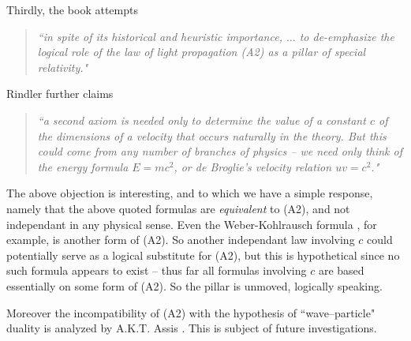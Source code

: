 \documentclass[12pt]{amsart}
\theoremstyle{definition}
\theoremstyle{remark}
\begin{document}
Thirdly, the book \cite[pp.8-10, 21-22]{rindler} attempts 
\begin{quote}
\emph{``in spite of its historical and heuristic importance, $\ldots$ to de-emphasize the logical role of the law of light propagation (A2) as a pillar of special relativity."}
\end{quote}
Rindler further claims 
\begin{quote}
\emph{``a second axiom is needed \emph{only} to determine the value of a constant $c$ of the dimensions of a velocity that occurs naturally in the theory. But this could come from any number of branches of physics -- we need only think of the energy formula $E=mc^2$, or de Broglie's velocity relation $u v =c^2$." }
\end{quote}
The above objection is interesting, and to which we have a simple response, namely that the above quoted formulas are \emph{equivalent} to (A2), and not independant in any physical sense. Even the Weber-Kohlrausch formula \cite{awk}, for example, is another form of (A2). So another independant law involving $c$ could potentially serve as a logical substitute for (A2), but this is hypothetical since no such formula appears to exist -- thus far all formulas involving $c$ are based essentially on some form of (A2). So the pillar is unmoved, logically speaking.  

Moreover the incompatibility of (A2) with the hypothesis of ``wave--particle" duality is analyzed by A.K.T. Assis \cite[\S 7.2.4, pp.133]{assis1999relational}. This is subject of future investigations.







\end{document}
